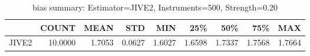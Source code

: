 \begin{table}[ht]
\centering
\caption{bias summary: Estimator=JIVE2, Instruments=500, Strength=0.20}
\begin{tabular}{lrrrrrrrr}
\toprule
 & COUNT & MEAN & STD & MIN & 25\% & 50\% & 75\% & MAX \\
\midrule
JIVE2 & 10.0000 & 1.7053 & 0.0627 & 1.6027 & 1.6598 & 1.7337 & 1.7568 & 1.7664 \\
\bottomrule
\end{tabular}
\end{table}
